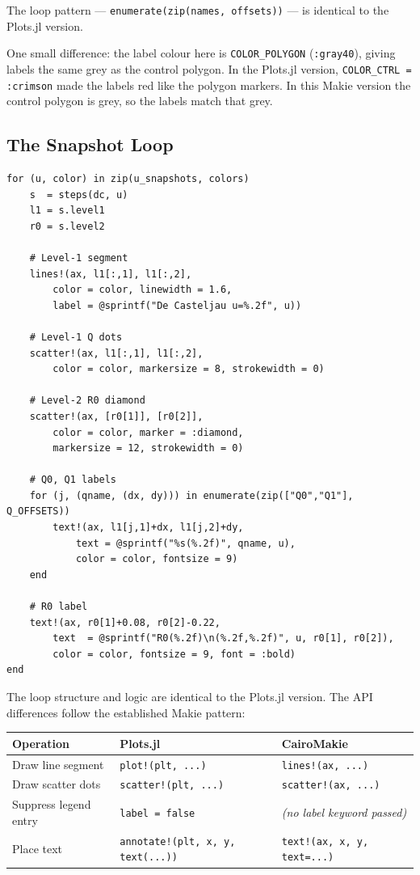 \documentclass[12pt, a4paper]{article}
\newcommand{\cd}[1]{\texttt{#1}}
\begin{document}
The loop pattern --- \cd{enumerate(zip(names, offsets))} ---
is identical to the Plots.jl version.

One small difference: the label colour here is
\cd{COLOR\_POLYGON} (\cd{:gray40}), giving
labels the same grey as the control polygon.
In the Plots.jl version, \cd{COLOR\_CTRL = :crimson}
made the labels red like the polygon markers.
In this Makie version the control polygon is grey,
so the labels match that grey.

\subsection{The Snapshot Loop}

\begin{verbatim}
for (u, color) in zip(u_snapshots, colors)
    s  = steps(dc, u)
    l1 = s.level1
    r0 = s.level2

    # Level-1 segment
    lines!(ax, l1[:,1], l1[:,2],
        color = color, linewidth = 1.6,
        label = @sprintf("De Casteljau u=%.2f", u))

    # Level-1 Q dots
    scatter!(ax, l1[:,1], l1[:,2],
        color = color, markersize = 8, strokewidth = 0)

    # Level-2 R0 diamond
    scatter!(ax, [r0[1]], [r0[2]],
        color = color, marker = :diamond,
        markersize = 12, strokewidth = 0)

    # Q0, Q1 labels
    for (j, (qname, (dx, dy))) in enumerate(zip(["Q0","Q1"], Q_OFFSETS))
        text!(ax, l1[j,1]+dx, l1[j,2]+dy,
            text = @sprintf("%s(%.2f)", qname, u),
            color = color, fontsize = 9)
    end

    # R0 label
    text!(ax, r0[1]+0.08, r0[2]-0.22,
        text  = @sprintf("R0(%.2f)\n(%.2f,%.2f)", u, r0[1], r0[2]),
        color = color, fontsize = 9, font = :bold)
end
\end{verbatim}

The loop structure and logic are identical to the Plots.jl
version.
The API differences follow the established Makie pattern:

\begin{center}
\begin{tabular}{lll}
\toprule
Operation & Plots.jl & CairoMakie \\
\midrule
Draw line segment & \cd{plot!(plt, ...)} & \cd{lines!(ax, ...)} \\
Draw scatter dots & \cd{scatter!(plt, ...)} & \cd{scatter!(ax, ...)} \\
Suppress legend entry & \cd{label = false} & \textit{(no label keyword passed)} \\
Place text & \cd{annotate!(plt, x, y, text(...))} & \cd{text!(ax, x, y, text=...)} \\
\bottomrule
\end{tabular}
\end{center}
\end{document}
